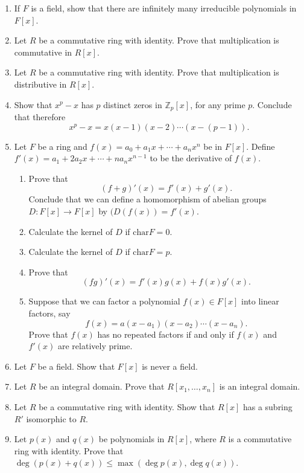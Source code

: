 {\begin{enumerate}
\item
If $F$ is a field, show that there are infinitely many irreducible polynomials in $F[x]$.

\item
Let $R$ be a commutative ring with identity. Prove that multiplication is commutative in $R[x]$.

\item
Let $R$ be a commutative ring with identity. Prove that multiplication is distributive in $R[x]$.
 
\item
Show that $x^p - x$ has $p$ distinct zeros in ${\mathbb Z}_p[x]$, for any prime $p$.  Conclude that therefore
$$
x^p-x = x(x-1)(x-2) \cdots (x - (p - 1)).
$$
 
\item
Let $F$ be a ring and $f(x) = a_0 + a_1 x + \cdots + a_n x^n$ be in $F[x]$. Define $f'(x) = a_1  + 2 a_2 x + \cdots + n a_n x^{n - 1}$ to be the {\bfi derivative\/} of $f(x)$. 
\begin{enumerate}
 
 \item
Prove that
$$
(f + g)'(x) = f'(x) + g'(x).
$$
Conclude that we can define a homomorphism of abelian groups $D : F[x] \rightarrow F[x]$ by $(D(f(x)) = f'(x)$.
 
 \item
Calculate the kernel of $D$ if $\mbox{char} F = 0$.
 
 \item
Calculate the kernel of $D$ if $\mbox{char} F = p$.
 
 \item
Prove that
$$
(fg)'(x) = f'(x)g(x) + f(x) g'(x).
$$
 
 \item
Suppose that we can factor a polynomial $f(x) \in F[x]$ into linear factors, say
$$
f(x) = a(x - a_1) (x - a_2) \cdots ( x - a_n).
$$
Prove that $f(x)$ has no repeated factors if and only if $f(x)$ and $f'(x)$ are relatively prime.
 
\end{enumerate}

\item
Let $F$ be a field. Show that $F[x]$ is never a field.

\item
Let $R$ be an integral domain.  Prove that $R[x_1, \ldots, x_n]$ is an integral domain.
 
\item
Let $R$ be a commutative ring with identity.  Show that $R[x]$ has a subring $R'$ isomorphic to $R$.
 
\item
Let $p(x)$ and $q(x)$ be polynomials in $R[x]$, where $R$ is a commutative ring with identity.  Prove that  $\deg( p(x) + q(x) ) \leq \max( \deg p(x), \deg q(x) )$. 

\end{enumerate}
}
 


